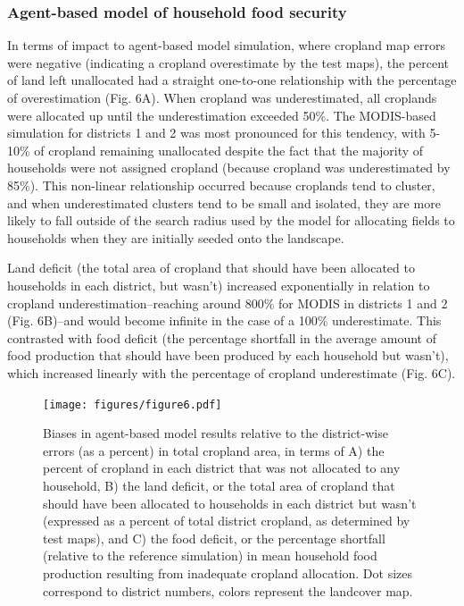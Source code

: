 \documentclass[a4paper]{article}
\begin{document}
\subsubsection*{Agent-based model of household food security}
In terms of impact to agent-based model simulation, where cropland map errors were negative (indicating a cropland overestimate by the test maps), the percent of land left unallocated had a straight one-to-one relationship with the percentage of overestimation (Fig. 6A). When cropland was underestimated, all croplands were allocated up until the underestimation exceeded 50\%. The MODIS-based simulation for districts 1 and 2 was most pronounced for this tendency, with 5-10\% of cropland remaining unallocated despite the fact that the majority of households were not assigned cropland (because cropland was underestimated by 85\%). This non-linear relationship occurred because croplands tend to cluster, and when underestimated clusters tend to be small and isolated, they are more likely to fall outside of the search radius used by the model for allocating fields to households when they are initially seeded onto the landscape. 

Land deficit (the total area of cropland that should have been allocated to households in each district, but wasn't) increased exponentially in relation to cropland underestimation--reaching around 800\% for MODIS in districts 1 and 2 (Fig. 6B)--and would become infinite in the case of a 100\% underestimate. This contrasted with food deficit (the percentage shortfall in the average amount of food production that should have been produced by each household but wasn't), which increased linearly with the percentage of cropland underestimate (Fig. 6C). 


\begin{figure}[!ht]
\centerline{\texttt{[image: figures/figure6.pdf]}}
\caption{Biases in agent-based model results relative to the district-wise errors (as a percent) in total cropland area, in terms of A) the percent of cropland in each district that was not allocated to any household, B) the land deficit, or the total area of cropland that should have been allocated to households in each district but wasn't (expressed as a percent of total district cropland, as determined by test maps), and C) the food deficit, or the percentage shortfall (relative to the reference simulation) in mean household food production resulting from inadequate cropland allocation. Dot sizes correspond to district numbers, colors represent the landcover map.}
\label{afoto}
\end{figure}
\end{document}
